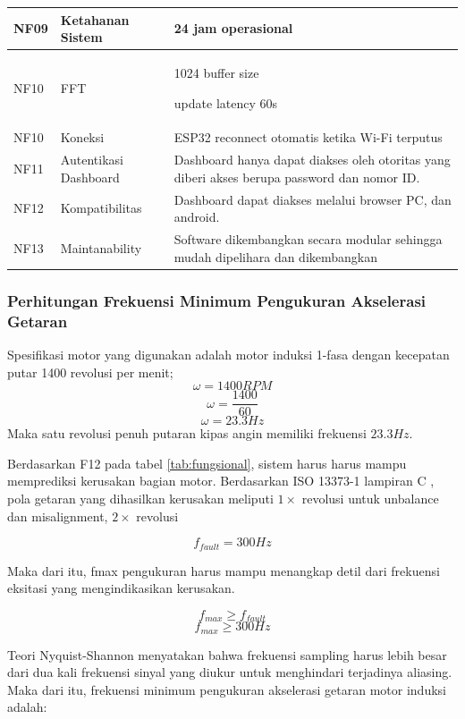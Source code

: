 \documentclass{elsinta}
\begin{document}
\begin{longtable}{|p{1.5cm}|p{3cm}|p{9cm}|}
    NF09 & Ketahanan Sistem &
    24 jam operasional
    \\
    \hline
    NF10 & FFT &
    1024 buffer size

    update latency 60s
    \\
    \hline
    
    NF10 & Koneksi &
    ESP32 reconnect otomatis ketika Wi-Fi terputus
    \\
    \hline
    
    NF11 & Autentikasi Dashboard &
    Dashboard hanya dapat diakses oleh otoritas yang diberi akses berupa password dan nomor ID.
    \\
    \hline

    NF12 & Kompatibilitas &
    Dashboard dapat diakses melalui browser PC, dan android.
    \\
    \hline

    NF13 & Maintanability &
    Software dikembangkan secara modular sehingga mudah dipelihara dan dikembangkan
    \\
    \hline

\end{longtable}


\subsubsection{Perhitungan Frekuensi Minimum Pengukuran Akselerasi Getaran}
    Spesifikasi motor yang digunakan adalah motor 
    induksi 1-fasa dengan kecepatan putar 1400 
    revolusi per menit;
    \[\omega=1400RPM\]
    \[\omega=\frac{1400}{60}\]
    \[\omega=23.3 Hz\]
    Maka satu revolusi penuh putaran kipas angin memiliki frekuensi $23.3 Hz$.
    
    Berdasarkan F12 pada tabel \ref{tab:fungsional}, sistem harus
    harus mampu memprediksi kerusakan bagian motor. Berdasarkan ISO 13373-1 lampiran C
    , pola getaran yang dihasilkan kerusakan meliputi $1\times$
    revolusi untuk unbalance dan misalignment, $2\times$ revolusi

    \[f_{fault}=300 Hz\]

    Maka dari itu, fmax pengukuran harus mampu menangkap detil
    dari frekuensi eksitasi yang mengindikasikan kerusakan.

    \[f_{max} \geq f_{fault}\] 
    \[f_{max} \geq 300 Hz\]

    Teori Nyquist-Shannon menyatakan bahwa frekuensi 
    sampling harus lebih besar dari dua kali 
    frekuensi sinyal yang diukur untuk menghindari terjadinya
    aliasing. Maka dari itu, frekuensi
    minimum pengukuran akselerasi getaran motor induksi
    adalah:
\end{document}

